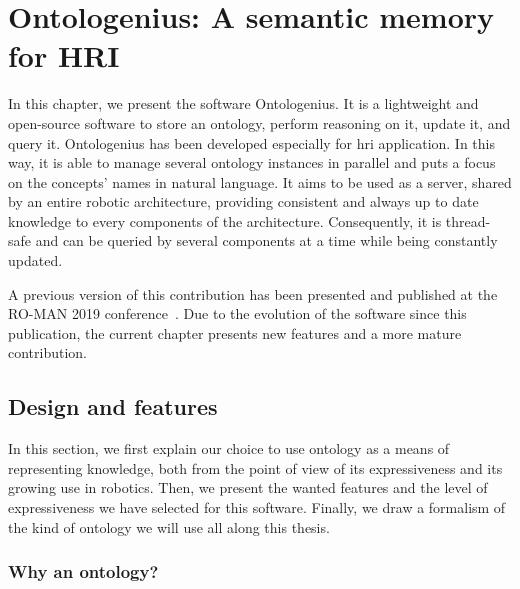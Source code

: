 \ifdefined{}
\else
\setcounter{chapter}{2} %
\dominitoc
\faketableofcontents
\fi

\chapter{Ontologenius: A semantic memory for HRI}
\label{chap:ontologenius}
\minitoc
\label{chap:2}

In this chapter, we present the software Ontologenius. It is a lightweight and open-source software to store an ontology, perform reasoning on it, update it, and query it. Ontologenius has been developed especially for \acrlong{hri} application. In this way, it is able to manage several ontology instances in parallel and puts a focus on the concepts' names in natural language. It aims to be used as a server, shared by an entire robotic architecture, providing consistent and always up to date knowledge to every components of the architecture. Consequently, it is thread-safe and can be queried by several components at a time while being constantly updated.

A previous version of this contribution has been presented and published at the RO-MAN 2019 conference~\cite{sarthou_2019_ontologenius}. Due to the evolution of the software since this publication, the current chapter presents new features and a more mature contribution.

\section{Design and features}

In this section, we first explain our choice to use ontology as a means of representing knowledge, both from the point of view of its expressiveness and its growing use in robotics. Then, we present the wanted features and the level of expressiveness we have selected for this software. Finally, we draw a formalism of the kind of ontology we will use all along this thesis.

\subsection{Why an ontology?}

